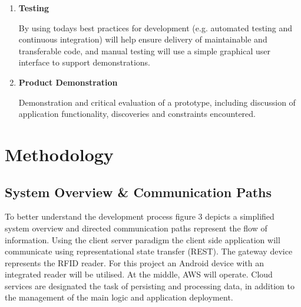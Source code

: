 \documentclass[a4paper, 11pt]{article}
\begin{document}
\begin{enumerate}
  \item \textbf{Testing}
   	\begin{flushleft}By using todays best practices for development (e.g. automated testing and continuous integration) will help ensure delivery of maintainable and transferable code, and manual testing will use a simple graphical user interface to support demonstrations. 
 	\end{flushleft}
 
 \item \textbf{Product Demonstration}
 	\begin{flushleft}Demonstration and critical evaluation of a prototype, including discussion of application functionality, discoveries and constraints encountered. 
 	\end{flushleft}
\end{enumerate}
\clearpage







\section{Methodology}

\subsection{System Overview \& Communication Paths}

To better understand the development process figure 3 depicts a simplified system overview and directed communication paths represent the flow of information. Using the client server paradigm the client side application will communicate using representational state transfer (REST)\cite{REST}. The gateway device represents the RFID reader. For this project an Android device with an integrated reader will be utilised. At the middle, AWS will operate. Cloud services are designated the task of persisting and processing data, in addition to the management of the main logic and application deployment. 
\end{document}
